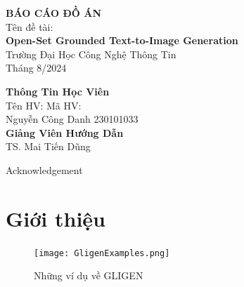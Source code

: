 \documentclass[12pt]{report}
\newcommand\tab[1][1cm]{\hspace*{#1}}
\begin{document}
\thispagestyle{empty}
\begin{center}

	\vspace*{3cm}
	{\bf \LARGE BÁO CÁO ĐỒ ÁN}\\
	\vspace*{2cm}
	Tên đề tài:\\
	{\bf \Large Open-Set Grounded Text-to-Image Generation}\\
	\vspace{3cm}
	{\Large Trường Đại Học Công Nghệ Thông Tin}\\
	\vspace{5cm}
	{\Large Tháng 8/2024}
\end{center}

\newpage
\vspace*{5cm}
\begin{center}
	{\bf \Large Thông Tin Học Viên}\\
	Tên HV: \tab Mã HV:\\
	Nguyễn Công Danh \tab 230101033\\
	\vspace{5cm}
	{\bf \Large Giảng Viên Hướng Dẫn}\\
	TS. Mai Tiến Dũng
\end{center}

\newpage
 {Acknowledgement}

\tableofcontents
\listoffigures
\listoftables
\chapter{Giới thiệu}

\begin{figure}[ht]
	\begin{center}
		\texttt{[image: GligenExamples.png]}
		\caption{Những ví dụ về GLIGEN}\label{fig:GligenExamples}
	\end{center}
\end{figure}
\end{document}
